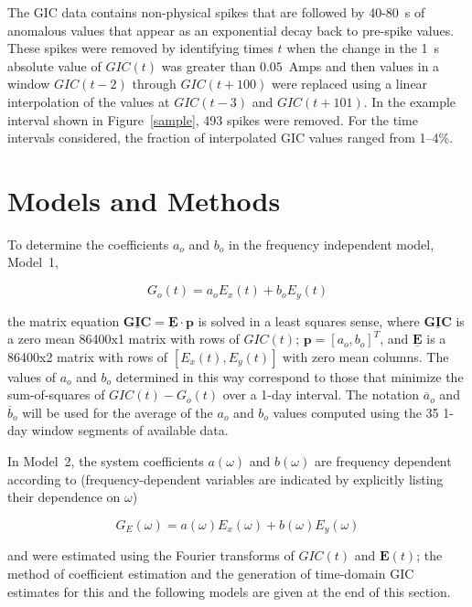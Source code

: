 \documentclass[draft,linenumbers]{agujournal2018}
\begin{document}
The GIC data contains non-physical spikes that are followed by 40-80~s of anomalous values that appear as an exponential decay back to pre-spike values. These spikes were removed by identifying times $t$ when the change in the 1~s absolute value of $GIC(t)$ was greater than $0.05$~Amps and then values in a window $GIC(t-2)$ through $GIC(t+100)$ were replaced using a linear interpolation of the values at $GIC(t-3)$ and $GIC(t + 101)$. In the example interval shown in Figure~\ref{sample}, 493 spikes were removed. For the time intervals considered, the fraction of interpolated GIC values ranged from 1--4\%.

\section{Models and Methods}
\label{section:Models_and_Methods}

To determine the coefficients $a_o$ and $b_o$ in the frequency independent model, Model~1,

\begin{linenomath*}
\begin{equation}
G_o(t) = a_oE_x(t) + b_oE_y(t)
\label{model1}
\end{equation}
\end{linenomath*}

\noindent
the matrix equation $\underline{\mathbf{GIC}} = \underline{\mathbf{E}}\cdot\mathbf{p}$ is solved in a least squares sense, where $\underline{\mathbf{GIC}}$ is a zero mean 86400x1 matrix with rows of $GIC(t)$; $\mathbf{p} = [a_o,b_o]^T$, and $\underline{\mathbf{E}}$ is a 86400x2 matrix with rows of $[E_x(t), E_y(t)]$ with zero mean columns. The values of $a_o$ and $b_o$ determined in this way correspond to those that minimize the sum-of-squares of $GIC(t)-G_o(t)$ over a 1-day interval. \citep[][provided the mathematically equivalent closed-form equations for solving the matrix equation.]{Pulkkinen2007} The notation $\overline{a}_o$ and $\overline{b}_o$ will be used for the average of the $a_o$ and $b_o$ values computed using the 35 1-day window segments of available data.

In Model~2, the system coefficients $a(\omega)$ and $b(\omega)$ are frequency dependent according to (frequency-dependent variables are indicated by explicitly listing their dependence on $\omega$)

\begin{linenomath*}
\begin{equation}
G_E(\omega) = a(\omega)E_x(\omega) + b(\omega)E_y(\omega)
\label{model2}
\end{equation}
\end{linenomath*}
\noindent
and were estimated using the Fourier transforms of  $GIC(t)$ and $\mathbf{E}(t)$; the method of coefficient estimation and the generation of time-domain GIC estimates for this and the following models are given at the end of this section.
\end{document}
